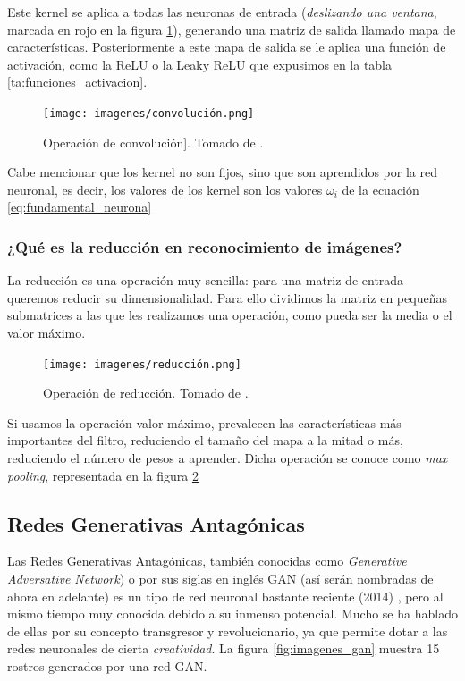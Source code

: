 \documentclass[../main.tex]{subfiles}
\begin{document}
Este kernel se aplica a todas las neuronas de entrada (\textit{deslizando una ventana}, marcada en rojo en la figura \ref{fig:convolución}), generando una matriz de salida llamado mapa de características. Posteriormente a este mapa de salida se le aplica una función de activación, como la ReLU o la Leaky ReLU que expusimos en la tabla \ref{ta:funciones_activacion}. 

\begin{figure}[h]
    \centering
    \texttt{[image: imagenes/convolución.png]}
    \caption[Operación de convolución]{Operación de convolución]. Tomado de \cite{Calvo2017}.}
    \label{fig:convolución}
\end{figure}

Cabe mencionar que los kernel no son fijos, sino que son aprendidos por la red neuronal, es decir, los valores de los kernel son los valores $\omega_{i}$ de la ecuación \ref{eq:fundamental_neurona}

\subsubsection{¿Qué es la reducción en reconocimiento de imágenes?}

La reducción es una operación muy sencilla: para una matriz de entrada queremos reducir su dimensionalidad. Para ello dividimos la matriz en pequeñas submatrices a las que les realizamos una operación, como pueda ser la media o el valor máximo.\newline 

\begin{figure}[h]
    \centering
    \texttt{[image: imagenes/reducción.png]}
    \caption[Operación de reducción]{Operación de reducción. Tomado de \cite{Calvo2017}.}
    \label{fig:reducción}
\end{figure}

Si usamos la operación valor máximo, prevalecen las características más importantes del filtro, reduciendo el tamaño del mapa a la mitad o más, reduciendo el número de pesos a aprender. Dicha operación se conoce como \textit{max pooling}, representada en la figura \ref{fig:reducción}

\subsection{Redes Generativas Antagónicas}

Las Redes Generativas Antagónicas, también conocidas como \textit{Generative Adversative Network}) o por sus siglas en inglés GAN (así serán nombradas de ahora en adelante) es un tipo de red neuronal bastante reciente (2014) \cite{Goodfellow2014}, pero al mismo tiempo muy conocida debido a su inmenso potencial. Mucho se ha hablado de ellas por su concepto transgresor y revolucionario, ya que permite dotar a las redes neuronales de cierta \textit{creatividad}. La figura \ref{fig:imagenes_gan} muestra 15 rostros generados por una red GAN. \newline
\end{document}
